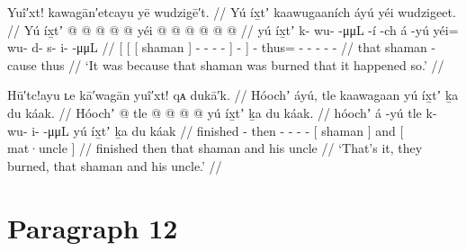 
\ex\label{ex:91-119-because-burn-happen}%
%
\begingl
	\glpreamble	Yuî′xt! kawagān′etcayu yē wudzigē′t. //
	\glpreamble	Yú íx̱tʼ kaawugaaních áyú yéi wudzigeet. //
	\gla	{} {} {} Yú íx̱tʼ {}  @ {} @ {} @ {} @ {} {} {} {} 
		 @ {}
		yéi @  @ {} @ {} @ {} @ {} @ {} //
	\glb	{} {} {} yú íx̱tʼ {} k- wu-  -μμL -í {} -ch {}
		á -yú
		yéi= wu- d- s- i-  -μμL //
	\glc	{}[ {}[ {}[  shaman {}]
			- -  - - {}] - {}]
		 -
		thus= - - - -  - //
	\gld	{} {} {} that shaman {} 
			 {} {} {} {} {} -cause {}
		 {}
		thus  {} {} {} {} {} //
	\glft	‘It was because that shaman was burned that it happened so.’
		//
\endgl
\xe

\ex\label{ex:91-120-burned-up-shaman-and-uncle}%
%
\begingl
	\glpreamble	Hū′tc!ayu ʟe kā′wagān yuî′xt! qᴀ dukā′k. //
	\glpreamble	Hóochʼ áyú, tle kaawagaan yú íx̱tʼ ḵa du káak. //
	\gla	Hóochʼ  @ {}
		tle  @ {} @ {} @ {} @ {}
		{} yú íx̱tʼ {} ḵa {} du káak. {} //
	\glb	hóochʼ á -yú
		tle k- wu- i-  -μμL
		{} yú íx̱tʼ {} ḵa {} du káak {} //
	\glc	finished  -
		then - - -  -
		{}[  shaman {}] and {}[  mat·uncle {}] //
	\gld	finished  {}
		then  {} {} {} {}
		{} that shaman {} and {} his uncle {} //
	\glft	‘That’s it, they burned, that shaman and his uncle.’
		//
\endgl
\xe

\section{Paragraph 12}\label{sec:91-para-12}

